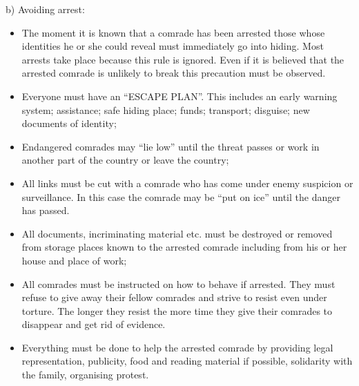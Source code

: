 b) Avoiding arrest:

\begin{itemize}
\tightlist
\item
  The moment it is known that a comrade has been arrested those whose
  identities he or she could reveal must immediately go into hiding.
  Most arrests take place because this rule is ignored. Even if it is
  believed that the arrested comrade is unlikely to break this
  precaution must be observed.
\item
  Everyone must have an ``ESCAPE PLAN''. This includes an early warning
  system; assistance; safe hiding place; funds; transport; disguise; new
  documents of identity;
\item
  Endangered comrades may ``lie low'' until the threat passes or work in
  another part of the country or leave the country;
\item
  All links must be cut with a comrade who has come under enemy
  suspicion or surveillance. In this case the comrade may be ``put on
  ice'' until the danger has passed.
\item
  All documents, incriminating material etc. must be destroyed or
  removed from storage places known to the arrested comrade including
  from his or her house and place of work;
\item
  All comrades must be instructed on how to behave if arrested. They
  must refuse to give away their fellow comrades and strive to resist
  even under torture. The longer they resist the more time they give
  their comrades to disappear and get rid of evidence.
\item
  Everything must be done to help the arrested comrade by providing
  legal representation, publicity, food and reading material if
  possible, solidarity with the family, organising protest.
\end{itemize}

